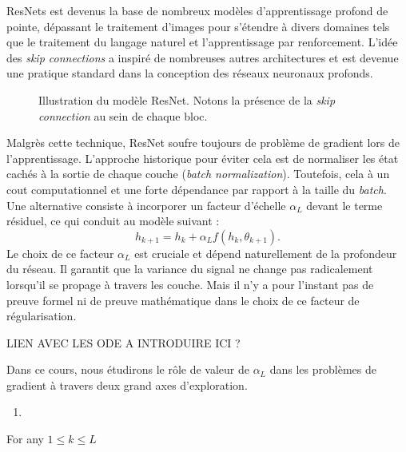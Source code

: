 \documentclass{report}
\theoremstyle{plain}%
\theoremstyle{definition}
\theoremstyle{remark}
\begin{document}
ResNets est devenus la base de nombreux modèles d'apprentissage profond de pointe, dépassant le traitement d'images pour s'étendre à divers domaines tels que le traitement du langage naturel et l'apprentissage par renforcement. L'idée des \textit{skip connections} a inspiré de nombreuses autres architectures et est devenue une pratique standard dans la conception des réseaux neuronaux profonds.

\begin{figure}[htbp]
    \centering
    \caption{Illustration du modèle ResNet. Notons la présence de la \textit{skip connection} au sein de chaque bloc.}
    \label{fig:resnet}
\end{figure}

Malgrès cette technique, ResNet soufre toujours de problème de gradient lors de l'apprentissage. L'approche historique pour éviter cela est de normaliser les état cachés à la sortie de chaque couche (\textit{batch normalization}). Toutefois, cela à un cout computationnel et une forte dépendance par rapport à la taille du \textit{batch}. Une alternative consiste à incorporer un facteur d'échelle \( \alpha_L \) devant le terme résiduel, ce qui conduit au modèle suivant : 
\[
    h_{k+1} = h_k + \alpha_L f(h_k, \theta_{k+1})
.\]
Le choix de ce facteur $ \alpha _L $ est cruciale et dépend naturellement de la profondeur du réseau. Il garantit que la variance du signal ne change pas radicalement lorsqu'il se propage à travers les couche. Mais il n'y a pour l'instant pas de preuve formel ni de preuve mathématique dans le choix de ce facteur de régularisation.

LIEN AVEC LES ODE A INTRODUIRE ICI ?

Dans ce cours, nous étudirons le rôle de valeur de $ \alpha _L $ dans les problèmes de gradient à travers deux grand axes d'exploration. 
\begin{enumerate}
    \item 
\end{enumerate}






















For any $ 1 \leq  k \leq L  $ 
\end{document}
